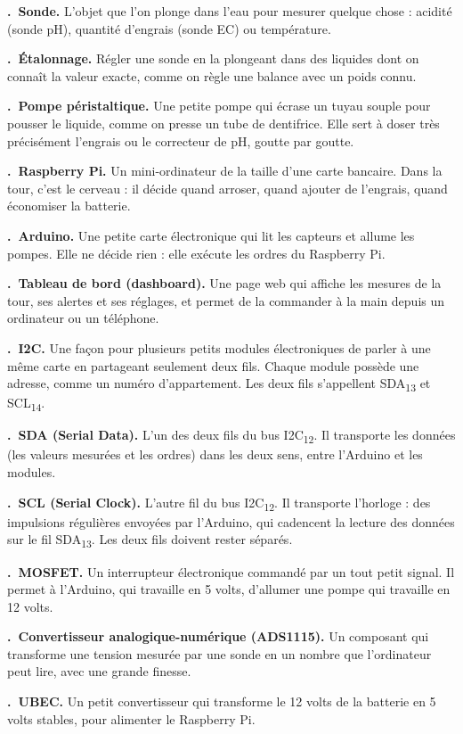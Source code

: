 \documentclass[11pt,a4paper]{article}
\newcounter{lex}
\newcommand{\terme}[2]{\par\medskip\noindent\stepcounter{lex}\textbf{\thelex.\ #1.} #2\par}
\newcommand{\ix}[1]{\textsubscript{#1}}
\begin{document}
\terme{Sonde}{L'objet que l'on plonge dans l'eau pour mesurer quelque chose : acidité (sonde pH), quantité d'engrais (sonde EC) ou température.}

\terme{Étalonnage}{Régler une sonde en la plongeant dans des liquides dont on connaît la valeur exacte, comme on règle une balance avec un poids connu.}

\terme{Pompe péristaltique}{Une petite pompe qui écrase un tuyau souple pour pousser le liquide, comme on presse un tube de dentifrice. Elle sert à doser très précisément l'engrais ou le correcteur de pH, goutte par goutte.}

\terme{Raspberry Pi}{Un mini-ordinateur de la taille d'une carte bancaire. Dans la tour, c'est le cerveau : il décide quand arroser, quand ajouter de l'engrais, quand économiser la batterie.}

\terme{Arduino}{Une petite carte électronique qui lit les capteurs et allume les pompes. Elle ne décide rien : elle exécute les ordres du Raspberry Pi.}

\terme{Tableau de bord (dashboard)}{Une page web qui affiche les mesures de la tour, ses alertes et ses réglages, et permet de la commander à la main depuis un ordinateur ou un téléphone.}

\terme{I2C}{Une façon pour plusieurs petits modules électroniques de parler à une même carte en partageant seulement deux fils. Chaque module possède une adresse, comme un numéro d'appartement. Les deux fils s'appellent SDA\ix{13} et SCL\ix{14}.}

\terme{SDA (Serial Data)}{L'un des deux fils du bus I2C\ix{12}. Il transporte les données (les valeurs mesurées et les ordres) dans les deux sens, entre l'Arduino et les modules.}

\terme{SCL (Serial Clock)}{L'autre fil du bus I2C\ix{12}. Il transporte l'horloge : des impulsions régulières envoyées par l'Arduino, qui cadencent la lecture des données sur le fil SDA\ix{13}. Les deux fils doivent rester séparés.}

\terme{MOSFET}{Un interrupteur électronique commandé par un tout petit signal. Il permet à l'Arduino, qui travaille en 5 volts, d'allumer une pompe qui travaille en 12 volts.}

\terme{Convertisseur analogique-numérique (ADS1115)}{Un composant qui transforme une tension mesurée par une sonde en un nombre que l'ordinateur peut lire, avec une grande finesse.}

\terme{UBEC}{Un petit convertisseur qui transforme le 12 volts de la batterie en 5 volts stables, pour alimenter le Raspberry Pi.}
\end{document}
